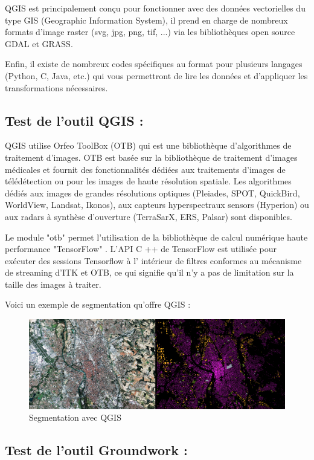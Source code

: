 \documentclass[12pt, openany]{report}
\begin{document}
QGIS est principalement conçu pour fonctionner avec des données vectorielles du type GIS (Geographic Information System), il prend en charge de nombreux formats d'image raster (svg, jpg, png, tif, ...) via les bibliothèques open source GDAL et GRASS.

Enfin, il existe de nombreux codes spécifiques au format pour plusieurs langages (Python, C, Java, etc.) qui vous permettront de lire les données et d'appliquer les transformations nécessaires.

\subsection{Test de l'outil QGIS :}
QGIS utilise Orfeo ToolBox (OTB) qui est une bibliothèque d’algorithmes de traitement d’images. OTB est basée sur la bibliothèque de traitement d’images médicales et fournit des fonctionnalités dédiées aux traitements d’images de télédétection ou pour les images de haute résolution spatiale. Les algorithmes dédiés aux images de grandes résolutions optiques (Pleiades, SPOT, QuickBird, WorldView, Landsat, Ikonos), aux capteurs hyperspectraux sensors (Hyperion) ou aux radars à synthèse d’ouverture (TerraSarX, ERS, Palsar) sont disponibles.\cite{ref12}

Le module "otb" permet l'utilisation de la bibliothèque de calcul numérique haute performance "TensorFlow" . L'API C ++ de TensorFlow est utilisée pour exécuter des sessions Tensorflow à l' intérieur de filtres conformes au mécanisme de streaming d'ITK et OTB, ce qui signifie qu'il n'y a pas de limitation sur la taille des images à traiter.\cite{ref13}


Voici un exemple de segmentation qu'offre QGIS :
\begin{figure}[H]
\centering
\noindent
\includegraphics[width=1\textwidth]{test_segmentation.png}
\caption{Segmentation avec QGIS}
\end{figure}

\subsection{Test de l'outil Groundwork :}
\end{document}
